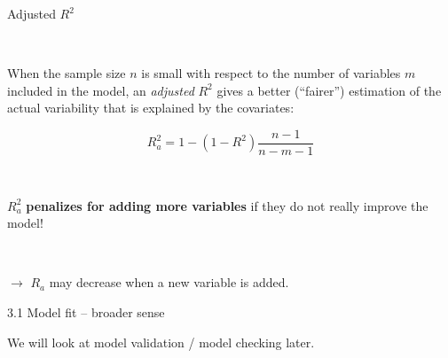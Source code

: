 \documentclass[10pt,ignorenonframetext,]{beamer}
\begin{document}
\begin{frame}

\begin{block}{Adjusted \(R^2\)}

\(~\)

When the sample size \(n\) is small with respect to the number of
variables \(m\) included in the model, an \emph{adjusted} \(R^2\) gives
a better (``fairer'') estimation of the actual variability that is
explained by the covariates:

\begin{equation*}
R^2_a = 1-(1-R^2 )\frac{n-1}{n-m-1}
\end{equation*}

\(~\)

\(R^2_a\) \textbf{penalizes for adding more variables} if they do not
really improve the model!

\(~\)

\(\rightarrow\) \(R_a\) may decrease when a new variable is added.

\end{block}

\end{frame}

\begin{frame}

\begin{block}{3.1 Model fit -- broader sense}

We will look at model validation / model checking later.

\end{block}

\end{frame}
\end{document}
